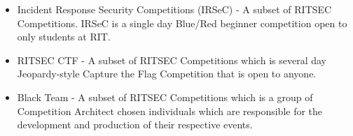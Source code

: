 \begin{itemize}
  \item Incident Response Security Competitions (IRSeC) - A subset of RITSEC 
    Competitions. IRSeC is a single day Blue/Red 
    beginner competition open to only students at RIT.

  \item RITSEC CTF - A subset of RITSEC Competitions which is several day
    Jeopardy-style Capture the Flag Competition that is open to anyone.
  
  \item Black Team - A subset of RITSEC Competitions which is a group of 
    Competition Architect chosen individuals which are responsible for the
    development and production of their respective events.

\end{itemize}

